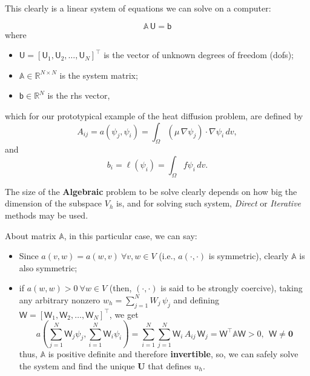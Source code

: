 \begin{kaobox}[backgroundcolor={blue!10!white}]
This clearly is a linear system of equations we can solve on a computer:
	
\begin{equation}
\mathbb{A} \, \boldsymbol{\mathsf{U}}
 = \boldsymbol{\mathsf{b}}
\end{equation}
where 
\begin{itemize}
\item $\boldsymbol{\mathsf{U}} = [\mathsf{U}_1, \mathsf{U}_2, \dots, \mathsf{U}_N]^{\intercal}$
is the vector of unknown degrees of freedom (dofs);
\item $\mathbb{A} \in \mathbb{R}^{N \times N}$ is the system matrix;
\item $\boldsymbol{\mathsf{b}} \in \mathbb{R}^{N}$ is the rhs vector,
\end{itemize}
which for our prototypical example of the heat diffusion problem, are defined by
\begin{equation}
A_{ij} = a(\psi_j,\psi_i) = \int_{\Omega}{\left ( \mu \, \nabla{\psi}_j \right )\cdot \nabla{\psi}_i }\,dv,
\end{equation}
and
\begin{equation}
b_i = \ell(\psi_i) = \int_{\Omega}{f \psi_i }\,dv.
\end{equation}

The size of the \textbf{Algebraic} problem to be solve clearly
depends on how big the dimension of the subspace $V_h$ is, and
for solving such system, \emph{Direct} or \emph{Iterative}
methods may be used.

\end{kaobox}

About matrix $\mathbb{A}$, in this particular case, we can say:
\begin{itemize}
	\item Since $a(v,w) = a(w,v)~\forall v,w \in V$ (i.e., $a(\cdot,\cdot)$ is symmetric),
	clearly $\mathbb{A}$ is also symmetric;\\
	\item if $a(w,w) > 0~\forall w \in V$ (then, $(\cdot,\cdot)$ is said to be strongly coercive), taking
	any arbitrary nonzero $w_h = \sum_{j=1}^{N}{W_j \, \psi_j}$ and
	defining $\boldsymbol{\mathsf{W}} = [\mathsf{W}_1, \mathsf{W}_2, \dots, \mathsf{W}_N]^{\intercal}$, we get
	\begin{equation}
	a\left (\sum_{j=1}^{N}{\mathsf{W}_j\psi_j},\sum_{i=1}^{N}{\mathsf{W}_i\psi_i} \right) = \sum_{i=1}^{N}\sum_{j=1}^{N}{\mathsf{W}_i \, A_{ij} \, \mathsf{W}_j}
	= \boldsymbol{\mathsf{W}}^{\intercal} \mathbb{A} \boldsymbol{\mathsf{W}} > 0,~~\boldsymbol{\mathsf{W}} \ne \mathbf{0}
	\end{equation}
	thus, $\mathbb{A}$ is positive definite and therefore \textbf{invertible},
	so, we can safely solve the system and find the unique $\mathbf{U}$
	that defines $u_h$. \\
\end{itemize}

